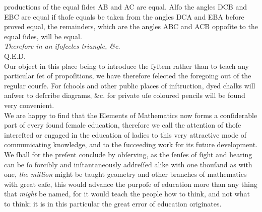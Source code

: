 \newpage

\begin{minipage}{0.80\textwidth}
    productions of the equal ſides AB and AC are equal.  Alſo the angles DCB and EBC are equal if thoſe equals be taken from the angles DCA and EBA before proved equal, the remainders, which are the angles ABC and ACB oppoſite to the equal ſides, will be equal.\\

    \textit{Therefore in an iſoſceles triangle, \&c}.\\

    \hfill Q.E.D.\\

    Our object in this place being to introduce the ſyſtem rather than to teach any particular ſet of propoſitions, we have therefore ſelected the foregoing out of the regular courſe. For ſchools and other public places of inſtruction, dyed chalks will anſwer to deſcribe diagrams, \&c. for private uſe coloured pencils will be found very convenient.\\

    We are happy to find that the Elements of Mathematics now forms a conſiderable part of every ſound female education, therefore we call the attention of thoſe intereſted or engaged in the education of ladies to this very attractive mode of communicating knowledge, and to the ſucceeding work for its future development.\\

    We ſhall for the preſent conclude by obſerving, as the ſenſes of ſight and hearing can be ſo forcibly and inſtantaneously addreſſed alike with one thouſand as with one, \textit{the million} might be taught geometry and other branches of mathematics with great eaſe, this would advance the purpoſe of education more than any thing that \textit{might} be named, for it would teach the people how to think, and not what to think; it is in this particular the great error of education originates.
\end{minipage}
